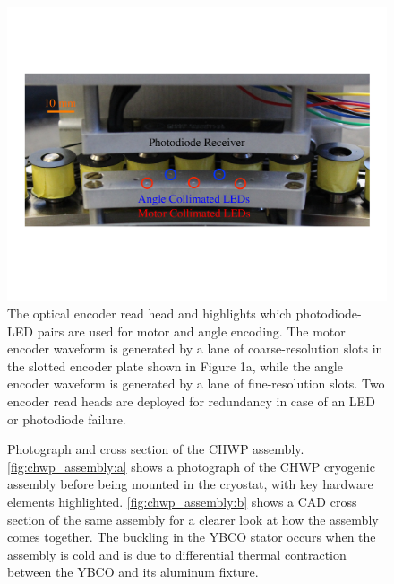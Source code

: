 \begin{figure}[!ht]
    \centering
    \includegraphics[width=0.6\linewidth]{CHWPDesign/Figures/Encoder.pdf}
    \caption[Photograph of the CHWP optical encoder]{The optical encoder read head and highlights which photodiode-LED pairs are used for motor and angle encoding. The motor encoder waveform is generated by a lane of coarse-resolution slots in the slotted encoder plate shown in Figure 1a, while the angle encoder waveform is generated by a lane of fine-resolution slots. Two encoder read heads are deployed for redundancy in case of an LED or photodiode failure.}
    \label{fig:chwp_encoder}
\end{figure}

\begin{figure}
    \caption[Photograph and cross section of the CHWP assembly]{Photograph and cross section of the CHWP assembly. \ref{fig:chwp_assembly:a} shows a photograph of the CHWP cryogenic assembly before being mounted in the cryostat, with key hardware elements highlighted. \ref{fig:chwp_assembly:b} shows a CAD cross section of the same assembly for a clearer look at how the assembly comes together. The buckling in the YBCO stator occurs when the assembly is cold and is due to differential thermal contraction between the YBCO and its aluminum fixture.}
    \label{fig:chwp_assembly}
\end{figure}

